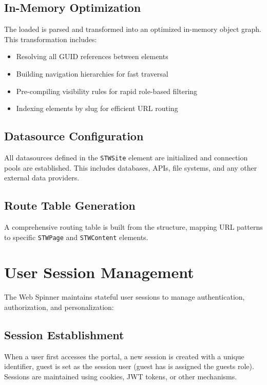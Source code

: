 \subsection{In-Memory Optimization}

The loaded \webbase{} is parsed and transformed into an optimized in-memory object graph. This transformation includes:

\begin{itemize}
	\item Resolving all GUID references between elements
	\item Building navigation hierarchies for fast traversal
	\item Pre-compiling visibility rules for rapid role-based filtering
	\item Indexing elements by slug for efficient URL routing
\end{itemize}

\subsection{Datasource Configuration}

All datasources defined in the \texttt{STWSite} element are initialized and connection pools are established. This includes databases, \rest{} APIs, file systems, and any other external data providers.

\subsection{Route Table Generation}

A comprehensive routing table is built from the \webbase{} structure, mapping URL patterns to specific \texttt{STWPage} and \texttt{STWContent} elements.

\section{User Session Management}
\label{sec:session-management}

The Web Spinner maintains stateful user sessions to manage authentication, authorization, and personalization:

\subsection{Session Establishment}

When a user first accesses the portal, a new session is created with a unique identifier, guest is set as the session user (guest has is assigned the guests role). Sessions are maintained using cookies, JWT tokens, or other mechanisms.

